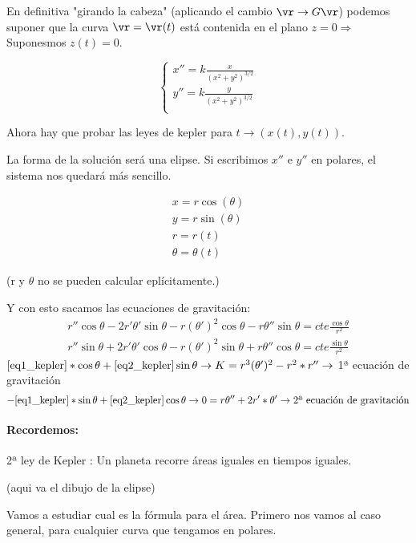 En definitiva "girando la cabeza" (aplicando el cambio $\vr \rightarrow G\vr$) podemos suponer que la curva $\vr = \vr(t)$ está contenida en el plano $z = 0 \Rightarrow$ Suponesmos $z(t) = 0$.


$$
\begin{cases}
 x'' = k\frac{x}{(x^2 + y^2)^{3/2}}\\
 y'' = k\frac{y}{(x^2 + y^2)^{3/2}}\\
\end{cases}
$$

Ahora hay que probar las leyes de kepler para $t \rightarrow (x(t), y(t))$.

La forma de la solución será una elipse.
Si escribimos $x''$ e $y''$ en polares, el sistema nos quedará más sencillo.

$$\begin{array}{c}
x = r\cos(\theta)\\
y = r\sin(\theta) \\
r = r(t) \\
\theta = \theta(t)
\end{array}
$$

(r y $\theta$ no se pueden calcular eplícitamente.)

Y con esto sacamos las ecuaciones de gravitación:
\begin{gather}
r''\cos\theta - 2r'\theta'\sin\theta - r(\theta')^2\cos\theta - r\theta''\sin\theta = cte \frac{\cos\theta}{r^2} \label{eq1_kepler}\\
r''\sin\theta + 2r'\theta'\cos\theta - r(\theta')^2\sin\theta + r\theta''\cos\theta = cte \frac{\sin\theta}{r^2} \label{eq2_kepler}
\end{gather}
$\eqref{eq1_kepler}*\cos\theta + \eqref{eq2_kepler}\sin\theta \rightarrow K= r^3(\theta')^2 - r^2*r'' \rightarrow$ 1ª ecuación de gravitación
$$-\eqref{eq1_kepler}*\sin\theta + \eqref{eq2_kepler}\cos\theta \rightarrow 0= r \theta'' + 2r' * \theta' \rightarrow \text{2ª ecuación de gravitación}$$


\paragraph{Recordemos:}
2ª ley de Kepler : Un planeta recorre áreas iguales en tiempos iguales.

(aqui va el dibujo de la elipse)

Vamos a estudiar cual es la fórmula para el área.
Primero nos vamos al caso general, para cualquier curva que tengamos en polares.

